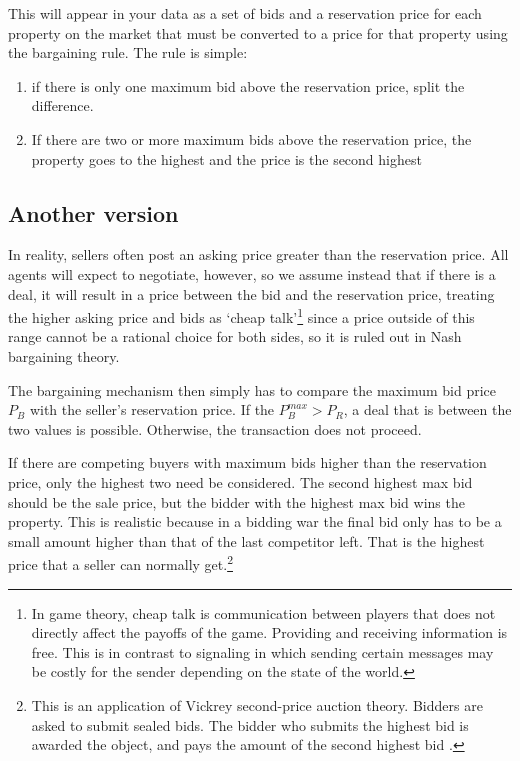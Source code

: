 {{This will appear in your data as a set of bids and a reservation price for each property on the market that must be converted to a price for that property using the bargaining rule. The rule is simple: 
\begin{enumerate}
    \item if there is only one maximum bid above the reservation price, split the difference.

    \item If there are two or more maximum bids above the reservation price, the property goes to the highest  and the price is the second highest
\end{enumerate}


\subsection{Another version}
In reality, sellers often post an asking price greater than the reservation price. All agents will expect to negotiate, however, so we assume instead that if there is a deal, it will result in a price between the bid and the reservation price, treating the higher asking price and bids as `cheap talk'\footnote{In game theory, cheap talk is communication between players that does not directly affect the payoffs of the game. Providing and receiving information is free. This is in contrast to signaling in which sending certain messages may be costly for the sender depending on the state of the world.} since a price outside of this range cannot be a rational choice for both sides, so it is ruled out in Nash bargaining theory.

The bargaining  mechanism then simply has to compare the maximum bid price $P_B$ with the seller's reservation price. If the $P_B^{max}>P_R$, a deal that is between the two values is possible. Otherwise, the transaction does not proceed.

If there are competing buyers with maximum bids higher than the reservation price, only the highest two need be considered. The second highest max bid should be the sale price, but the bidder with the highest max bid wins the property. This is realistic because in a bidding war the final bid only has to be a small amount higher than that of the last competitor left. That is the highest price that a seller can normally get.\footnote{This is an application of Vickrey \gls{second-price auction} theory. Bidders are asked to submit sealed bids. %
The bidder who submits the highest bid is awarded the object, and pays the amount of the second highest bid \cite{levinAuctionTheory2004}.}

}}
